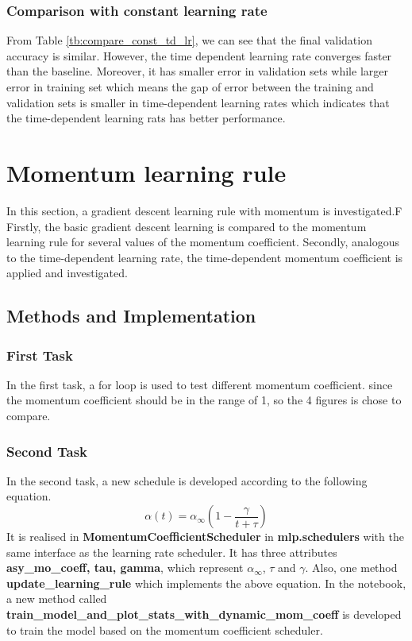 \documentclass[11pt]{article}
\begin{document}
\subsubsection{Comparison with constant learning rate}
From Table \ref{tb:compare_const_td_lr}, we can see that the final validation accuracy is similar. However, the time dependent learning rate converges faster than the baseline. Moreover, it has smaller error in validation sets while larger error in training set which means the gap of error between the training and validation sets is smaller in time-dependent learning rates which indicates that the time-dependent learning rats has better performance. 


\newpage
\section{Momentum learning rule}
In this section, a gradient descent learning rule with momentum is investigated.F Firstly, the basic gradient descent learning is compared to the momentum learning rule for several values of the momentum coefficient. Secondly, analogous to the time-dependent learning rate, the time-dependent momentum coefficient is applied and investigated.
\subsection{Methods and Implementation}
\subsubsection{First Task}
In the first task, a for loop is used to test different momentum coefficient. since the momentum coefficient should be in the range of  1\rbrack, so the 4 figures is chose to compare.
\subsubsection{Second Task}
In the second task, a new schedule is developed according to the following equation.
\begin{equation}
	\alpha(t) = \alpha_\infty (1 - \frac{\gamma}{t + \tau} )
\end{equation}
It is realised in {\bf MomentumCoefficientScheduler} in {\bf mlp.schedulers} with the same interface as the learning rate scheduler. It has three attributes {\bf asy\_mo\_coeff, tau, gamma}, which represent $\alpha_\infty$, $\tau$ and $\gamma$. Also, one method {\bf update\_learning\_rule} which implements the above equation.
In the notebook, a new method called {\bf train\_model\_and\_plot\_stats\_with\_dynamic\_mom\_coeff} is developed to train the model based on the momentum coefficient scheduler. 
\end{document}
